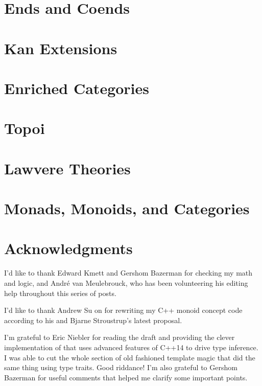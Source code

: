 \chapter{Ends and Coends}\label{ends-and-coends}


\chapter{Kan Extensions}\label{kan-extensions}


\chapter{Enriched Categories}\label{enriched-categories}


\chapter{Topoi}\label{topoi}


\chapter{Lawvere Theories}\label{lawvere-theories}


\chapter{Monads, Monoids, and Categories}\label{monads-monoids-categories}


\backmatter

\chapter*{Acknowledgments}

\noindent
I’d like to thank Edward Kmett and Gershom Bazerman for checking my math
and logic, and André van Meulebrouck, who has been volunteering his editing
help throughout this series of posts.

\vspace{1.0em}
\noindent
I’d like to thank Andrew Su on for rewriting my C++ monoid concept
code according to his and Bjarne Stroustrup’s latest proposal.

\vspace{1.0em}
\noindent
I'm grateful to Eric Niebler for reading the draft and providing the
clever implementation of  that uses advanced features of
C++14 to drive type inference. I was able to cut the whole section of
old fashioned template magic that did the same thing using type traits.
Good riddance! I'm also grateful to Gershom Bazerman for useful comments
that helped me clarify some important points.

